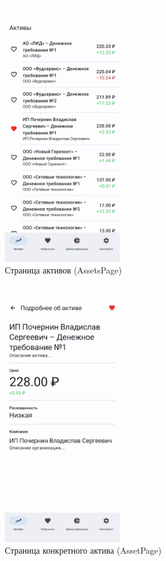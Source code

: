 \documentclass[a4paper, 14pt]{article}
\begin{document}
\begin{figure}[H]
    \centering
    \includegraphics[width=5cm]{resources/7.png}
    \caption{Страница активов (AssetsPage)}
\end{figure}

\begin{figure}[H]
    \centering
    \includegraphics[width=5cm]{resources/8.png}
    \caption{Страница конкретного актива (AssetPage)}
\end{figure}
\end{document}
